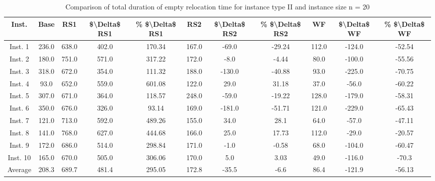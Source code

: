 \begin{table}[H]
\centering
\begin{tabular}{ccccccccccc}
  \hline
  \textbf{Inst.} & \textbf{Base} & \textbf{RS1} & \textbf{\$\textbackslash{}Delta\$  RS1} & \textbf{\% \$\textbackslash{}Delta\$  RS1} & \textbf{RS2} & \textbf{\$\textbackslash{}Delta\$  RS2} & \textbf{\% \$\textbackslash{}Delta\$  RS2} & \textbf{WF} & \textbf{\$\textbackslash{}Delta\$  WF} & \textbf{\% \$\textbackslash{}Delta\$  WF} \\\hline
  Inst. 1 & 236.0 & 638.0 & 402.0 & 170.34 & 167.0 & -69.0 & -29.24 & 112.0 & -124.0 & -52.54 \\
  Inst. 2 & 180.0 & 751.0 & 571.0 & 317.22 & 172.0 & -8.0 & -4.44 & 80.0 & -100.0 & -55.56 \\
  Inst. 3 & 318.0 & 672.0 & 354.0 & 111.32 & 188.0 & -130.0 & -40.88 & 93.0 & -225.0 & -70.75 \\
  Inst. 4 & 93.0 & 652.0 & 559.0 & 601.08 & 122.0 & 29.0 & 31.18 & 37.0 & -56.0 & -60.22 \\
  Inst. 5 & 307.0 & 671.0 & 364.0 & 118.57 & 248.0 & -59.0 & -19.22 & 128.0 & -179.0 & -58.31 \\
  Inst. 6 & 350.0 & 676.0 & 326.0 & 93.14 & 169.0 & -181.0 & -51.71 & 121.0 & -229.0 & -65.43 \\
  Inst. 7 & 121.0 & 713.0 & 592.0 & 489.26 & 155.0 & 34.0 & 28.1 & 64.0 & -57.0 & -47.11 \\
  Inst. 8 & 141.0 & 768.0 & 627.0 & 444.68 & 166.0 & 25.0 & 17.73 & 112.0 & -29.0 & -20.57 \\
  Inst. 9 & 172.0 & 686.0 & 514.0 & 298.84 & 171.0 & -1.0 & -0.58 & 68.0 & -104.0 & -60.47 \\
  Inst. 10 & 165.0 & 670.0 & 505.0 & 306.06 & 170.0 & 5.0 & 3.03 & 49.0 & -116.0 & -70.3 \\
  Average & 208.3 & 689.7 & 481.4 & 295.05 & 172.8 & -35.5 & -6.6 & 86.4 & -121.9 & -56.13 \\\hline
\end{tabular}
\caption{Comparison of total duration of empty relocation time for instance type II and instance size n = 20}
\label{tab:wait:resrelocation-empty-relocation-comparison_II_20}
\end{table}
